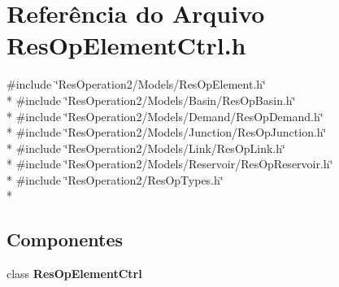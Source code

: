 \section{Referência do Arquivo Res\+Op\+Element\+Ctrl.\+h}
\label{_res_op_element_ctrl_8h}
{\ttfamily \#include \char`\"{}Res\+Operation2/\+Models/\+Res\+Op\+Element.\+h\char`\"{}}\\*
{\ttfamily \#include \char`\"{}Res\+Operation2/\+Models/\+Basin/\+Res\+Op\+Basin.\+h\char`\"{}}\\*
{\ttfamily \#include \char`\"{}Res\+Operation2/\+Models/\+Demand/\+Res\+Op\+Demand.\+h\char`\"{}}\\*
{\ttfamily \#include \char`\"{}Res\+Operation2/\+Models/\+Junction/\+Res\+Op\+Junction.\+h\char`\"{}}\\*
{\ttfamily \#include \char`\"{}Res\+Operation2/\+Models/\+Link/\+Res\+Op\+Link.\+h\char`\"{}}\\*
{\ttfamily \#include \char`\"{}Res\+Operation2/\+Models/\+Reservoir/\+Res\+Op\+Reservoir.\+h\char`\"{}}\\*
{\ttfamily \#include \char`\"{}Res\+Operation2/\+Res\+Op\+Types.\+h\char`\"{}}\\*
\subsection*{Componentes}
\begin{DoxyCompactItemize}
\item 
class {\bf Res\+Op\+Element\+Ctrl}
\end{DoxyCompactItemize}
